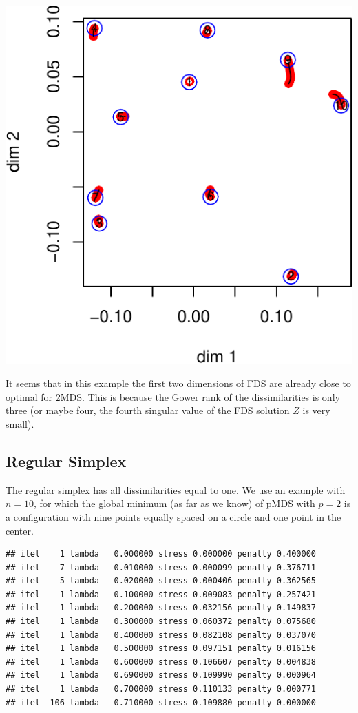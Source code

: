 \documentclass[
  12pt,
]{article}
\begin{document}
\begin{center}\includegraphics{penalty_files/figure-latex/chi-1} \end{center}

It seems that in this example the first two dimensions of FDS are
already close to optimal for 2MDS. This is because the Gower rank of the
dissimilarities is only three (or maybe four, the fourth singular value
of the FDS solution \(Z\) is very small).

\hypertarget{regular-simplex}{%
\subsection{Regular Simplex}\label{regular-simplex}}

The regular simplex has all dissimilarities equal to one. We use an
example with \(n=10\), for which the global minimum (as far as we know)
of pMDS with \(p=2\) is a configuration with nine points equally spaced
on a circle and one point in the center.

\begin{verbatim}
## itel    1 lambda   0.000000 stress 0.000000 penalty 0.400000 
## itel    7 lambda   0.010000 stress 0.000099 penalty 0.376711 
## itel    5 lambda   0.020000 stress 0.000406 penalty 0.362565 
## itel    1 lambda   0.100000 stress 0.009083 penalty 0.257421 
## itel    1 lambda   0.200000 stress 0.032156 penalty 0.149837 
## itel    1 lambda   0.300000 stress 0.060372 penalty 0.075680 
## itel    1 lambda   0.400000 stress 0.082108 penalty 0.037070 
## itel    1 lambda   0.500000 stress 0.097151 penalty 0.016156 
## itel    1 lambda   0.600000 stress 0.106607 penalty 0.004838 
## itel    1 lambda   0.690000 stress 0.109990 penalty 0.000964 
## itel    1 lambda   0.700000 stress 0.110133 penalty 0.000771 
## itel  106 lambda   0.710000 stress 0.109880 penalty 0.000000
\end{verbatim}
\end{document}

